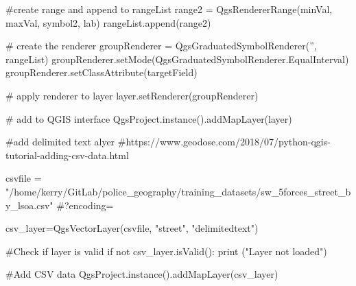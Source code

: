 #create range and append to rangeList
range2 = QgsRendererRange(minVal, maxVal, symbol2, lab)
rangeList.append(range2)

# create the renderer
groupRenderer = QgsGraduatedSymbolRenderer('', rangeList)
groupRenderer.setMode(QgsGraduatedSymbolRenderer.EqualInterval)
groupRenderer.setClassAttribute(targetField)

# apply renderer to layer
layer.setRenderer(groupRenderer)

# add to QGIS interface
QgsProject.instance().addMapLayer(layer)




#add delimited text alyer
#https://www.geodose.com/2018/07/python-qgis-tutorial-adding-csv-data.html

csvfile = "/home/kerry/GitLab/police_geography/training_datasets/sw_5forces_street_by_lsoa.csv"
#?encoding=%

csv_layer=QgsVectorLayer(csvfile, "street", "delimitedtext")

#Check if layer is valid
if not csv_layer.isValid():
print ("Layer not loaded")

#Add CSV data    
QgsProject.instance().addMapLayer(csv_layer)




